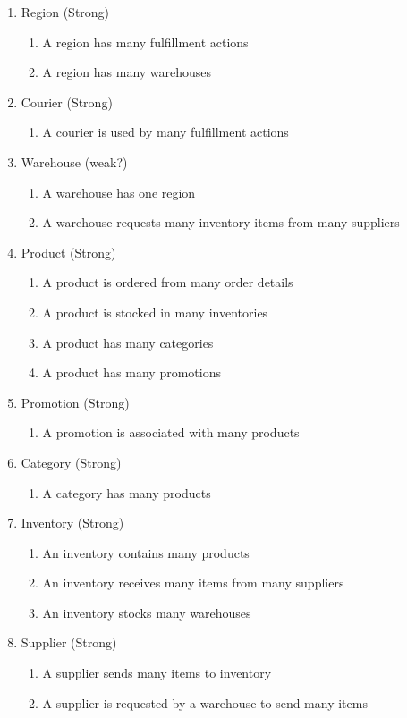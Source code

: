 \documentclass{article}
\begin{document}
\begin{enumerate}
\item Region (Strong)
\begin{enumerate}
	\item A region has many fulfillment actions
	\item A region has many warehouses
\end{enumerate}

\item Courier (Strong)
\begin{enumerate}
	\item A courier is used by many fulfillment actions
\end{enumerate}
	
\item Warehouse (weak?)
\begin{enumerate}
	\item A warehouse has one region
	\item A warehouse requests many inventory items from many suppliers
\end{enumerate}

\item Product (Strong)
\begin{enumerate}
	\item A product is ordered from many order details
	\item A product is stocked in many inventories
	\item A product has many categories
	\item A product has many promotions
\end{enumerate}

\item Promotion (Strong)
\begin{enumerate}
	\item A promotion is associated with many products
\end{enumerate}

\item Category (Strong)
\begin{enumerate}
	\item A category has many products
\end{enumerate}

\item Inventory (Strong)
\begin{enumerate}
	\item An inventory contains many products
	\item An inventory receives many items from many suppliers
	\item An inventory stocks many warehouses
\end{enumerate}

\item Supplier (Strong)
\begin{enumerate}
	\item A supplier sends many items to inventory
	\item A supplier is requested by a warehouse to send many items
\end{enumerate}

\end{enumerate}
\end{document}
